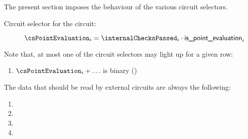 The present section imposes the behaviour of the various circuit selectors.
\begin{description}
    \item[Circuit selector for the  circuit:]
        $\csPointEvaluation_{i} = \internalChecksPassed_{i} \cdot \locIsPointEvaluation_{i}$
\end{description}

Note that, at most one of the circuit selectors may light up for a given row:
\begin{enumerate}
    \item $\csPointEvaluation_{i} + \hdots $ is binary \quad (\trash)
\end{enumerate}
The data that should be read by external circuits are always the following:
\begin{enumerate}
    \item \blsId{}
    \item \blsIndex{}
    \item \blsLimb{}
    \item \blsSuccessBit{}
\end{enumerate}


